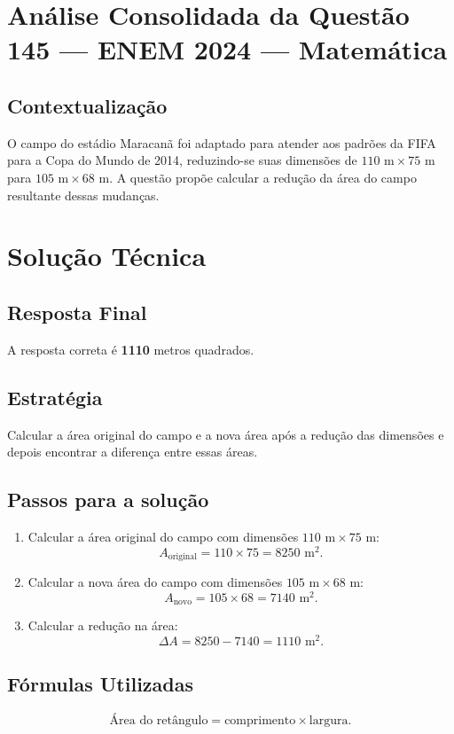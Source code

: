 \documentclass{article}
\begin{document}
\section*{Análise Consolidada da Questão 145 — ENEM 2024 — Matemática}

\subsection*{Contextualização}
O campo do estádio Maracanã foi adaptado para atender aos padrões da FIFA para a Copa do Mundo de 2014, reduzindo-se suas dimensões de \(110\text{ m} \times 75\text{ m}\) para \(105\text{ m} \times 68\text{ m}\). A questão propõe calcular a redução da área do campo resultante dessas mudanças.

\section{Solução Técnica}

\subsection{Resposta Final}
A resposta correta é \textbf{1110} metros quadrados.

\subsection{Estratégia}
Calcular a área original do campo e a nova área após a redução das dimensões e depois encontrar a diferença entre essas áreas.

\subsection{Passos para a solução}
\begin{enumerate}
  \item Calcular a área original do campo com dimensões \(110\text{ m} \times 75\text{ m}\):
  \[
    A_{\text{original}} = 110 \times 75 = 8250\text{ m}^2.
  \]
  \item Calcular a nova área do campo com dimensões \(105\text{ m} \times 68\text{ m}\):
  \[
    A_{\text{novo}} = 105 \times 68 = 7140\text{ m}^2.
  \]
  \item Calcular a redução na área:
  \[
    \Delta A = 8250 - 7140 = 1110\text{ m}^2.
  \]
\end{enumerate}

\subsection{Fórmulas Utilizadas}
\begin{equation}
\text{Área do retângulo} = \text{comprimento} \times \text{largura}.
\end{equation}
\end{document}
